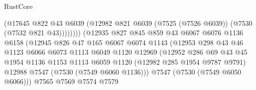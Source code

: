 \begin{lexlean}{RustCore}
\begin{coremodule}
                                        (@17645
                                          @822
                                          @43
                                          @6039
                                          (@12982
                                            @821
                                            @6039
                                            (@7525 (@7526 @6039))
                                            (@7530 (@7532 @821 @43))))))))
                                (@12935
                                  @827
                                  @845
                                  @859
                                  @43
                                  @6067
                                  @6076
                                  @1136
                                  @6158
                                  (@12945
                                    @826
                                    @47
                                    @165
                                    @6067
                                    @6074
                                    @1143
                                    (@12953
                                      @298
                                      @43
                                      @46
                                      @1123
                                      @6066
                                      @6073
                                      @1113
                                      @6049
                                      @1120
                                      @12969
                                      (@12952
                                        @286
                                        @69
                                        @43
                                        @45
                                        @1954
                                        @1136
                                        @1153
                                        @1113
                                        @6059
                                        @1120
                                        (@12982 @285 @1954 @9787 @9791)
                                        @12988
                                        @7547
                                        (@7530 (@7549 @6060 @1136)))
                                      @7547
                                      (@7530 (@7549 @6050 @6066)))
                                    @7565
                                    @7569
                                    @7574
                                    @7579

\end{coremodule}
\end{lexlean}
